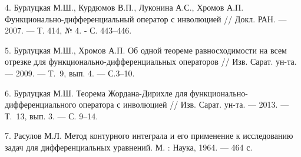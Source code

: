 4. Бурлуцкая М.Ш., Курдюмов В.П.,  Луконина А.С.,  Хромов А.П.
Функционально-дифференциальный оператор с инволюцией  // Докл. РАН.
--- 2007. --- Т. 414, № 4. - С. 443--446.

5.  Бурлуцкая М.Ш., Хромов А.П.  Об одной теореме равносходимости на
всем отрезке для функционально-диф\-фе\-рен\-циаль\-ных операторов
// Изв. Сарат. ун-та.   --- 2009. --- Т.~9, вып. 4. --- С.3--10.

6. Бурлуцкая М.Ш. Теорема Жордана-Дирихле для
функ\-цио\-нально-дифференциального оператора с инволюцией // Изв.
Сарат. ун-та.  --- 2013. --- Т.~13, вып. 3. --- С. 9--14.

7. Расулов М.Л. Метод контурного интеграла и его применение к
исследованию задач для дифференциальных уравнений.   М. : Наука,
1964. --- 464 с.
